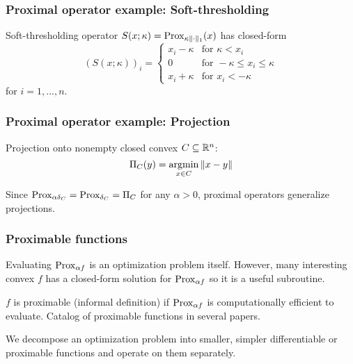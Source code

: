 \documentclass[10pt,mathserif]{beamer}
\begin{document}
\begin{frame}
\frametitle{Proximal operator example: Soft-thresholding}
Soft-thresholding operator
$S(x;\kappa)=\mathrm{Prox}_{\kappa \|\cdot\|_1}(x)$
has closed-form
\[
(S(x;\kappa))_i = \left\{
\begin{array}{ll}
x_i-\kappa &\text{for }  \kappa< x_i\\
0&\text{for } -\kappa \le x_i\le \kappa\\
x_i+\kappa &\text{for }  x_i<-\kappa
\end{array}
\right.
\]
for $i=1,\dots,n$.

\vspace{0.0in}

\begin{center}
\end{center}
\end{frame}

\begin{frame}
\frametitle{Proximal operator example: Projection}
Projection onto nonempty closed convex $C\subseteq\mathbb{R}^n$:
\[
\Pi_C(y)=\operatorname*{argmin}_{x\in C}\|x-y\|
\]
\vspace{0.2in}


Since $\mathrm{Prox}_{\alpha \delta_C}
=\mathrm{Prox}_{\delta_C}=\Pi_C$
for any $\alpha>0$,
 proximal operators generalize projections.
\end{frame}

\begin{frame}
\frametitle{Proximable functions}
Evaluating $\mathrm{Prox}_{\alpha f}$ is an optimization problem itself.
However, many interesting convex $f$ has a closed-form solution for $\mathrm{Prox}_{\alpha f}$ so it is a useful subroutine.


\vspace{0.2in}
$f$ is proximable (informal definition) if $\mathrm{Prox}_{\alpha f}$ is computationally efficient to evaluate.
Catalog of proximable functions in several papers.

\vspace{0.2in}

We decompose an optimization problem into smaller, simpler differentiable or proximable functions and operate on them separately.

\end{frame}
\end{document}
